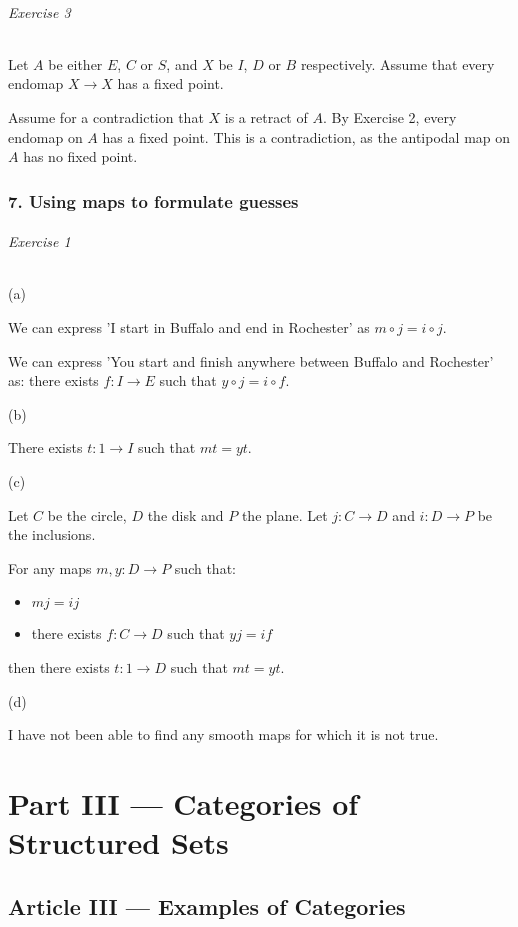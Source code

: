 \documentclass{report}
\begin{document}
    \paragraph{Exercise 3}
    Let $A$ be either $E$, $C$ or $S$, and $X$ be $I$, $D$ or $B$ respectively. Assume that every endomap $X \rightarrow X$ has a fixed point. 

    Assume for a contradiction that $X$ is a retract of $A$. By Exercise 2, every endomap
    on $A$ has a fixed point. This is a contradiction, as the antipodal map on $A$ has no fixed point.

    \section{7. Using maps to formulate guesses}

    \paragraph{Exercise 1}
    \subparagraph{(a)}
    We can express 'I start in Buffalo and end in Rochester' as $m \circ j = i \circ j$.

    We can express 'You start and finish anywhere between Buffalo and Rochester' as: there exists $f : I
    \rightarrow E$ such that $y \circ j = i \circ f$.

    \subparagraph{(b)}
    There exists $t : 1 \rightarrow I$ such that $mt = yt$.

    \subparagraph{(c)}
    Let $C$ be the circle, $D$ the disk and $P$ the plane. Let $j : C \rightarrow D$ and $i : D \rightarrow P$
    be the inclusions.

    For any maps $m, y : D \rightarrow P$ such that:
    \begin{itemize}
        \item $mj = ij$
        \item there exists $f : C \rightarrow D$ such that $yj = if$
    \end{itemize}
    then there exists $t : 1 \rightarrow D$ such that $mt = yt$.

    \subparagraph{(d)}
    I have not been able to find any smooth maps for which it is not true.

    \part{Part III --- Categories of Structured Sets}

    \chapter{Article III --- Examples of Categories}
\end{document}
